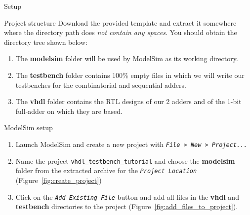 \documentclass[a4paper, 12pt, onecolumn]{article}
\begin{document}
\begin{section}{Setup}
    \begin{subsection}{Project structure}
        Download the provided template and extract it somewhere where the directory path does \emph{not contain any spaces}. You should obtain the directory tree shown below: \\


        \begin{enumerate}
            \item The \textbf{modelsim} folder will be used by ModelSim as its working directory.
            \item The \textbf{testbench} folder contains 100\% empty files in which we will write our testbenches for the combinatorial and sequential adders.
            \item The \textbf{vhdl} folder contains the RTL designs of our 2 adders and of the 1-bit full-adder on which they are based.
        \end{enumerate}
    \end{subsection}

    \begin{subsection}{ModelSim setup}
        \begin{enumerate}
            \item Launch ModelSim and create a new project with \textit{\texttt{File > New > Project...}}

            \item Name the project \texttt{vhdl\_testbench\_tutorial} and choose the \textbf{modelsim} folder from the extracted archive for the \textit{\texttt{Project Location}} (Figure~\ref{fig:create_project})

            \item Click on the \textit{\texttt{Add Existing File}} button and add all files in the \textbf{vhdl} and \textbf{testbench} directories to the project (Figure~\ref{fig:add_files_to_project}).


\end{enumerate}
\end{subsection}
\end{section}
\end{document}
